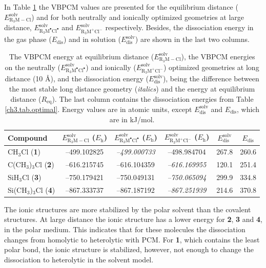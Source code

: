In Table \ref{ch3.tab.solution} the VBPCM values are presented for the equilibrium distance ($E_\mathrm{R_{3}M-Cl}^\mathrm{solv}$) and for both neutrally and ionically optimized geometries at large distance, $E_\mathrm{R_{3}M^\bullet Cl^\bullet}^\mathrm{solv}$ and $E_\mathrm{R_{3}M^{+} Cl^{-}}^\mathrm{solv}$ respectively. Besides, the dissociation energy in the gas phase ($E_\mathrm{dis}$) and in solution ($E_\mathrm{dis}^\mathrm{solv}$) are shown in the last two columns.
\begin{table}[htp]
\center
\caption{The VBPCM energy at equilibrium distance ($E_\mathrm{R_{3}M-Cl}^\mathrm{solv}$), the VBPCM energies on the neutrally ($E_\mathrm{R_{3}M^\bullet Cl^\bullet}^\mathrm{solv}$) and ionically ($E_\mathrm{R_{3}M^{+} Cl^{-}}^\mathrm{solv}$) optimized geometries at long distance (10 \AA), and the dissociation energy ($E_\mathrm{dis}^\mathrm{solv}$), being the difference between the most stable long distance geometry (\textit{italics}) and the energy at equilibrium distance ($R_\mathrm{eq}$). The last column contains the dissociation energies from Table \ref{ch3.tab.optimal}. Energy values are in atomic units, except $E_\mathrm{dis}^\mathrm{solv}$ and $E_\mathrm{dis}$, which are in kJ/mol.}
\begin{tabular}{|l|c|c|c|c|c|}
\hline
\textbf{Compound} & $E_\mathrm{R_{3}M-Cl}^\mathrm{solv}$ ($E_{\mathrm{h}}$) & $E_\mathrm{R_{3}M^\bullet Cl^\bullet}^\mathrm{solv}$ ($E_{\mathrm{h}}$) & $E_\mathrm{R_{3}M^{+} Cl^{-}}^\mathrm{solv}$ ($E_{\mathrm{h}}$) & $E_\mathrm{dis}^\mathrm{solv}$&
$E_\mathrm{dis}$\\
\hline
CH$_3$Cl (\textbf{1})& --499.102825 & \textit{--499.000733} & --498.984704 & 267.8 & 260.6 \\
C(CH$_3$)$_3$Cl (\textbf{2})& --616.215745 & --616.104359 & \textit{--616.169955} & 120.1 & 251.4 \\
SiH$_3$Cl (\textbf{3})& --750.179421& --750.049131 & \textit{--750.065094} &  299.9 & 334.8 \\
Si(CH$_3$)$_3$Cl (\textbf{4})& --867.333737 & --867.187192 & \textit{--867.251939} & 214.6 & 370.8 \\
\hline
\end{tabular}
\label{ch3.tab.solution}
\end{table} 

The ionic structures are more stabilized by the polar solvent than the covalent structures. At large distance the ionic structure has a lower energy for \textbf{2}, \textbf{3} and \textbf{4}, in the polar medium. This indicates that for these molecules the dissociation changes from homolytic to heterolytic with PCM. For \textbf{1}, which contains the least polar bond, the ionic structure is stabilized, however, not enough to change the dissociation to heterolytic in the solvent model.

